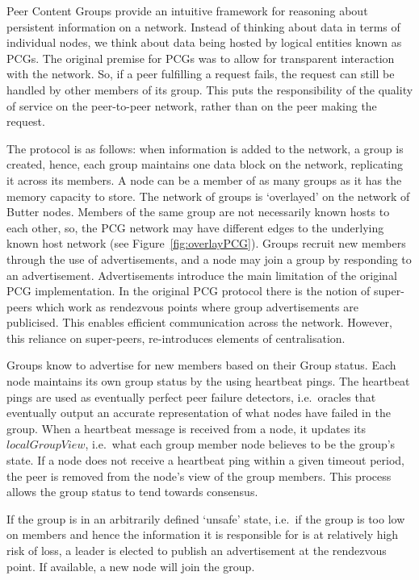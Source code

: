 Peer Content Groups provide an intuitive framework for reasoning about persistent information on a network. Instead of thinking about data in terms of individual nodes, we think about data being hosted by logical entities known as PCGs. The original premise for PCGs was to allow for transparent interaction with the network. So, if a peer fulfilling a request fails, the request can still be handled by other members of its group. This puts the responsibility of the quality of service on the peer-to-peer network, rather than on the peer making the request\cite{shinebourne2022availability}.

The protocol is as follows: when information is added to the network, a group is created, hence, each group maintains one data block on the network, replicating it across its members\cite{shinebourne2022availability}. A node can be a member of as many groups as it has the memory capacity to store. The network of groups is `overlayed' on the network of Butter nodes. Members of the same group are not necessarily known hosts to each other, so, the PCG network may have different edges to the underlying known host network (see Figure~\ref{fig:overlayPCG}). Groups recruit new members through the use of advertisements, and a node may join a group by responding to an advertisement. Advertisements introduce the main limitation of the original PCG implementation\cite{duarte2014reliable}. In the original PCG protocol there is the notion of super-peers which work as rendezvous points where group advertisements are publicised. This enables efficient communication across the network. However, this reliance on super-peers, re-introduces elements of centralisation.

Groups know to advertise for new members based on their Group status. Each node maintains its own group status by the using heartbeat pings. The heartbeat pings are used as eventually perfect peer failure detectors, i.e.\ oracles that eventually output an accurate representation of what nodes have failed in the group. When a heartbeat message is received from a node, it updates its $localGroupView$, i.e.\ what each group member node believes to be the group’s state. If a node does not receive a heartbeat ping within a given timeout period, the peer is removed from the node’s view of the group members. This process allows the group status to tend towards consensus.\cite{shinebourne2022availability}

If the group is in an arbitrarily defined `unsafe' state, i.e.\ if the group is too low on members and hence the information it is responsible for is at relatively high risk of loss, a leader is elected to publish an advertisement at the rendezvous point. If available, a new node will join the group.

